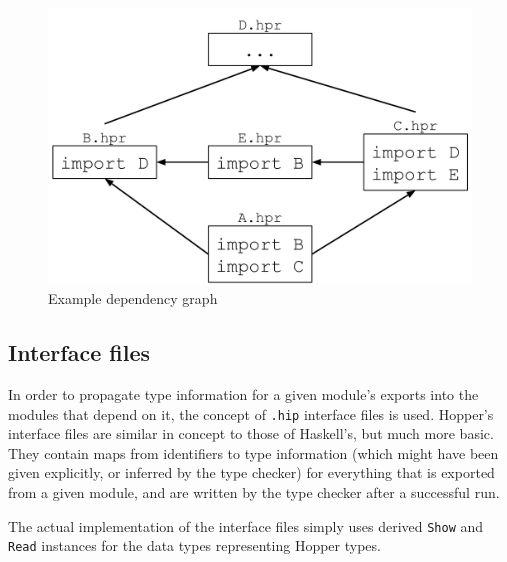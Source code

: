 \begin{figure}[h!]
\centering
  \includegraphics[width=0.6\pdfpagewidth]{figure/depgraph}
  \caption{Example dependency graph}
  \label{fig:depgraph}
\end{figure}

\subsection{Interface files}
In order to propagate type information for a given module's exports into the modules that depend on it, the concept of \texttt{.hip} interface files is used. Hopper's interface files are similar in concept to those of Haskell's\cite{interfacefiles}, but much more basic. They contain maps from identifiers to type information (which might have been given explicitly, or inferred by the type checker) for everything that is exported from a given module, and are written by the type checker after a successful run.

The actual implementation of the interface files simply uses derived \texttt{Show} and \texttt{Read} instances for the data types representing Hopper types.